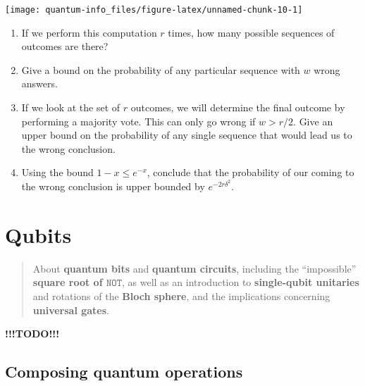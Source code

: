 \documentclass[fleqn]{article}
\providecommand{\tightlist}{%
  \setlength{\itemsep}{0pt}\setlength{\parskip}{0pt}}
\let\oldsection\section
\renewcommand\section{\clearpage\oldsection}
\begin{document}
\begin{center}\texttt{[image: quantum-info\_files/figure-latex/unnamed-chunk-10-1]} \end{center}

\begin{enumerate}
\def\labelenumi{\arabic{enumi}.}
\tightlist
\item
  If we perform this computation \(r\) times, how many possible sequences of outcomes are there?
\item
  Give a bound on the probability of any particular sequence with \(w\) wrong answers.
\item
  If we look at the set of \(r\) outcomes, we will determine the final outcome by performing a majority vote.
  This can only go wrong if \(w>r/2\).
  Give an upper bound on the probability of any single sequence that would lead us to the wrong conclusion.
\item
  Using the bound \(1-x\leqslant e^{-x}\), conclude that the probability of our coming to the wrong conclusion is upper bounded by \(e^{-2r\delta^2}\).
\end{enumerate}

\hypertarget{chapter2}{%
\section{Qubits}\label{chapter2}}

\begin{quote}
About \textbf{quantum bits} and \textbf{quantum circuits}, including the ``impossible'' \textbf{square root of \(\texttt{NOT}\)}, as well as an introduction to \textbf{single-qubit unitaries} and rotations of the \textbf{Bloch sphere}, and the implications concerning \textbf{universal gates}.
\end{quote}

\textbf{!!!TODO!!!}

\hypertarget{composing-quantum-operations}{%
\subsection{Composing quantum operations}\label{composing-quantum-operations}}
\end{document}
